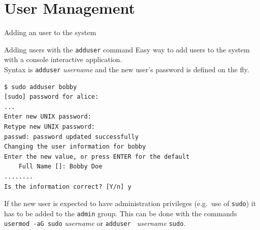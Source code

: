 \section{User Management}
\begin{frame}[t,fragile]{Adding an user to the system}

\vspace{-0.4cm}
  \begin{block}{Adding users with the \alert{\texttt{adduser}} command}
    {\footnotesize
Easy way to add users to the system with a console interactive application. \\Syntax is \alert{\texttt{adduser} \emph{username}} and the new user's password is defined on the fly.}

{\scriptsize
  \begin{lstlisting}
$ sudo adduser bobby
[sudo] password for alice: 
...
Enter new UNIX password: 
Retype new UNIX password: 
passwd: password updated successfully
Changing the user information for bobby
Enter the new value, or press ENTER for the default
	Full Name []: Bobby Doe
........
Is the information correct? [Y/n] y
  \end{lstlisting}
}
    {\footnotesize
If the new user is expected to have administration privileges (e.g.\ use of \texttt{sudo})  it has to be added to the \texttt{admin} group. This can be done with the commands \\ \alert{\texttt{usermod -aG sudo}} \emph{username} or \alert{\texttt{adduser } \emph{username} \texttt{sudo}}.}

  \end{block}
  
\end{frame}
